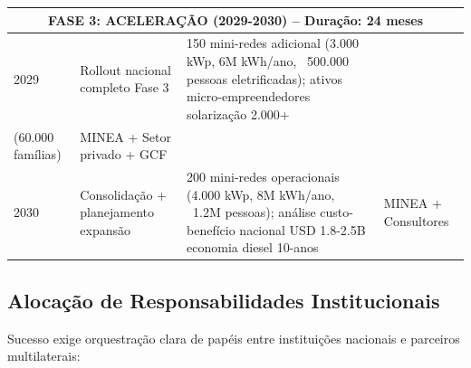 \documentclass[12pt, a4paper]{article}
\begin{document}
\begin{table}[H]
\begin{tabular}{|p{1.2cm}|p{3.2cm}|p{2.8cm}|p{2.5cm}|}
\hline
\multicolumn{4}{|c|}{\textbf{FASE 3: ACELERAÇÃO (2029-2030)} -- Duração: 24 meses} \\
\hline
2029 & Rollout nacional completo Fase 3 & 150 mini-redes adicional (3.000 kWp, 6M kWh/ano, ~500.000 pessoas eletrificadas); ativos micro-empreendedores solarização 2.000+ \\
(60.000 famílias) & MINEA + Setor privado + GCF \\
\hline
2030 & Consolidação + planejamento expansão & 200 mini-redes operacionais (4.000 kWp, 8M kWh/ano, ~1.2M pessoas); análise custo-benefício nacional USD 1.8-2.5B economia diesel 10-anos & MINEA + Consultores \\
\hline
\end{tabular}
\end{table}

\subsection{Alocação de Responsabilidades Institucionais}

Sucesso exige orquestração clara de papéis entre instituições nacionais e parceiros multilaterais:
\end{document}
